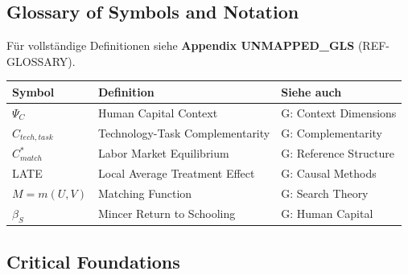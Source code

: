 \subsection{Glossary of Symbols and Notation}
\label{sec:aa-glossary}

Für vollständige Definitionen siehe \textbf{Appendix UNMAPPED_GLS} (REF-GLOSSARY).

\begin{center}
\renewcommand{\arraystretch}{1.3}
\begin{tabular}{|l|l|l|}
\hline
\textbf{Symbol} & \textbf{Definition} & \textbf{Siehe auch} \\
\hline
$\Psi_C$ & Human Capital Context & G: Context Dimensions \\
$C_{tech, task}$ & Technology-Task Complementarity & G: Complementarity \\
$C^*_{match}$ & Labor Market Equilibrium & G: Reference Structure \\
LATE & Local Average Treatment Effect & G: Causal Methods \\
$M = m(U,V)$ & Matching Function & G: Search Theory \\
$\beta_S$ & Mincer Return to Schooling & G: Human Capital \\
\hline
\end{tabular}
\end{center}

\subsection{Critical Foundations}
\label{sec:aa-foundations}

